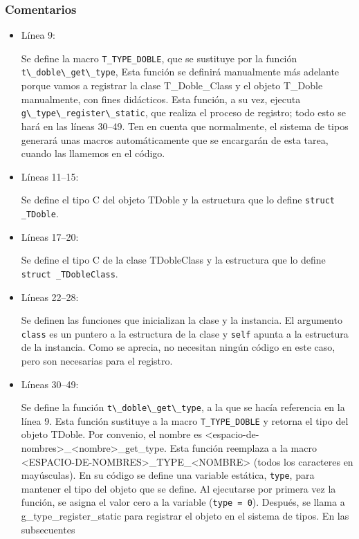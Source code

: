 \subsubsection{Comentarios}
\begin{itemize}
\item Línea 9:\par
  Se define la macro \texttt{T\_TYPE\_DOBLE}, que se sustituye por la función
  \passthrough{\lstinline!t\_doble\_get\_type!}, Esta función se definirá manualmente más adelante porque
  vamos a registrar la clase \textsf{T\_Doble\_Class} y  el objeto \textsf{T\_Doble} manualmente, con fines didácticos.
  Esta función, a su vez, ejecuta \passthrough{\lstinline!g\_type\_register\_static!}, que realiza
  el proceso de registro; todo esto se hará en las líneas 30--49.
  Ten en cuenta que normalmente, el sistema de tipos generará unas macros automáticamente que se encargarán
  de esta tarea, cuando las llamemos en el código.
\item Líneas 11--15:\par
  Se define el tipo C del objeto \textsf{TDoble} y la estructura que lo define \texttt{struct \_TDoble}.
\item Líneas 17--20:\par
  Se define el tipo C de la clase \textsf{TDobleClass} y la estructura que lo define \texttt{struct \_TDobleClass}.
\item Líneas 22--28:\par
  Se definen las funciones que inicializan la clase y la instancia. El argumento \texttt{class} es un puntero a la
  estructura de la clase y \texttt{self} apunta a la estructura de la instancia. Como se aprecia, no
  necesitan ningún código en este caso, pero son necesarias para el registro.
\item Líneas 30--49:\par
  Se define la función \passthrough{\lstinline!t\_doble\_get\_type!}, a la que se hacía referencia en la línea 9.
  Esta función sustituye a la macro \texttt{T\_TYPE\_DOBLE} y retorna el tipo del objeto \textsf{TDoble}.
  Por convenio, el nombre es \textsf{<espacio-de-nombres>\_<nombre>\_get\_type}. Esta función reemplaza
  a la macro \textsf{<ESPACIO-DE-NOMBRES>\_TYPE\_<NOMBRE>} (todos los caracteres en mayúsculas).
  En su código se define una variable estática, \texttt{type}, para mantener el tipo del objeto que se define.
  Al ejecutarse por primera vez la función, se asigna el valor cero a la variable (\texttt{type = 0}).
  Después, se llama a g\_type\_register\_static para registrar el objeto en el sistema de tipos. En las subsecuentes

\end{itemize}

